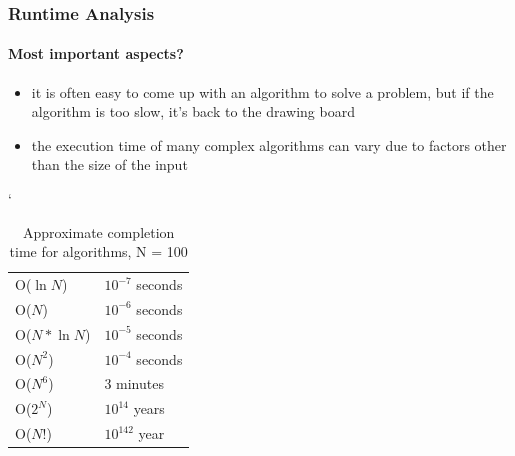 \documentclass{beamer}
\begin{document}
\begin{frame}
  \frametitle{Runtime Analysis}
  \framesubtitle{Most important aspects?}
  \begin{itemize}
    \item{it is often easy to come up with an algorithm to solve a problem, but if the algorithm is too slow, it’s back to the drawing board}
    \item{the execution time of many complex algorithms can vary due to factors other than the size of the input}
  \end{itemize}
  \begin{table}[h]
    \begin{center}
    \catcode`
    \begin{tabular}{| l | l |} \hline
      O($\ln{N}$) & $10^{-7}$ seconds \\
      O($N$) & $10^{-6}$ seconds \\
      O($N*\ln{N}$) & $10^{-5}$ seconds \\
      O($N^{2}$) & $10^{-4}$ seconds \\
      O($N^{6}$) & 3 minutes \\
      O($2^{N}$) & $10^{14}$ years \\
      O($N!$) & $10^{142}$ year \\ \hline
      \end{tabular}
      \caption{Approximate completion time for algorithms, N = 100} \nocite{table}
     \end{center}
   \end{table}
\end{frame}
\end{document}
